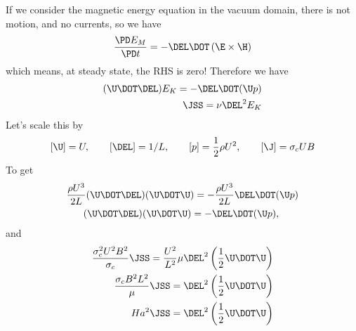 \documentclass[11pt]{article}
\begin{document}
If we consider the magnetic energy equation in the vacuum domain, there is not motion, and no currents, so we have
\begin{equation}
	\frac{\PD E_M}{\PD t} =	- \DEL \DOT \left(\E \times \H \right)
\end{equation}
which means, at steady state, the RHS is zero! Therefore we have
\begin{equation}\begin{aligned}
	(\U \DOT \DEL) E_K = - \DEL \DOT (\U p) \\
	\JSS = \nu \DEL^2 E_K
\end{aligned}\end{equation}
Let's scale this by
\begin{equation}\begin{aligned}
	[\U] = U, \qquad
	[\DEL] = 1/L, \qquad
	[p] = \frac{1}{2} \rho U^2, \qquad
	[\J] = \sigma_c U B
\end{aligned}\end{equation}
To get
\begin{equation}\begin{aligned}
	\frac{\rho U^3}{2L} (\U \DOT \DEL) ( \U \DOT \U ) =
	- \frac{\rho U^3}{2L} \DEL \DOT (\U p) \\
	(\U \DOT \DEL) ( \U \DOT \U ) =
	- \DEL \DOT (\U p), \qquad
\end{aligned}\end{equation}
and
\begin{equation}\begin{aligned}
	\frac{\sigma_c^2 U^2 B^2}{\sigma_c} \JSS =
	\frac{U^2}{L^2} \mu \DEL^2 \left( \frac{1}{2} \U \DOT \U \right) \\
	\frac{\sigma_c B^2 L^2}{\mu} \JSS =
	\DEL^2 \left( \frac{1}{2} \U \DOT \U \right) \\
	Ha^2 \JSS =
	\DEL^2 \left( \frac{1}{2} \U \DOT \U \right)
\end{aligned}\end{equation}

\end{document}
